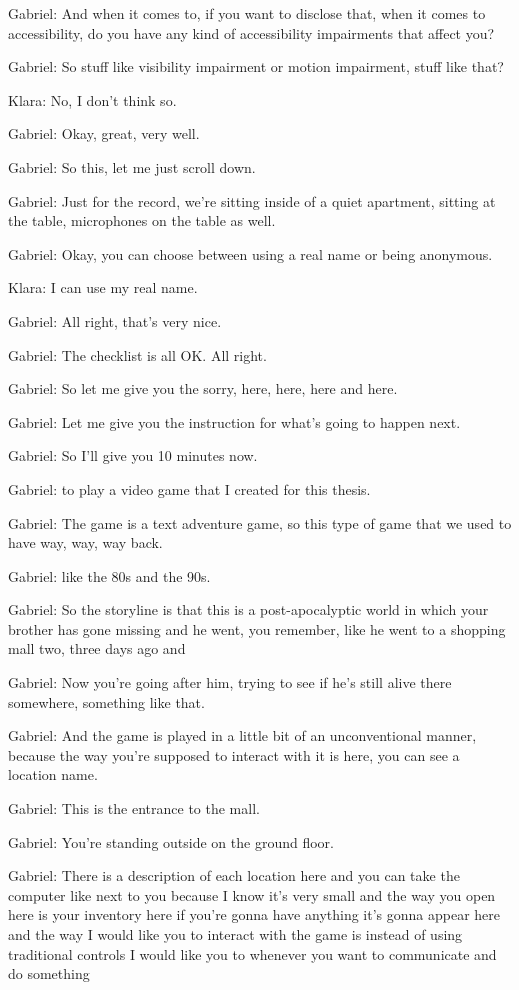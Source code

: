 Gabriel: And when it comes to, if you want to disclose that, when it comes to accessibility, do you have any kind of accessibility impairments that affect you?

Gabriel: So stuff like visibility impairment or motion impairment, stuff like that?

Klara: No, I don't think so.

Gabriel: Okay, great, very well.

Gabriel: So this, let me just scroll down.

Gabriel: Just for the record, we're sitting inside of a quiet apartment, sitting at the table, microphones on the table as well.

Gabriel: Okay, you can choose between using a real name or being anonymous.

Klara: I can use my real name.

Gabriel: All right, that's very nice.

Gabriel: The checklist is all OK. All right.

Gabriel: So let me give you the sorry, here, here, here and here.

Gabriel: Let me give you the instruction for what's going to happen next.

Gabriel: So I'll give you 10 minutes now.

Gabriel: to play a video game that I created for this thesis.

Gabriel: The game is a text adventure game, so this type of game that we used to have way, way, way back.

Gabriel: like the 80s and the 90s.

Gabriel: So the storyline is that this is a post-apocalyptic world in which your brother has gone missing and he went, you remember, like he went to a shopping mall two, three days ago and

Gabriel: Now you're going after him, trying to see if he's still alive there somewhere, something like that.

Gabriel: And the game is played in a little bit of an unconventional manner, because the way you're supposed to interact with it is here, you can see a location name.

Gabriel: This is the entrance to the mall.

Gabriel: You're standing outside on the ground floor.

Gabriel: There is a description of each location here and you can take the computer like next to you because I know it's very small and the way you open here is your inventory here if you're gonna have anything it's gonna appear here and the way I would like you to interact with the game is instead of using traditional controls I would like you to whenever you want to communicate and do something

